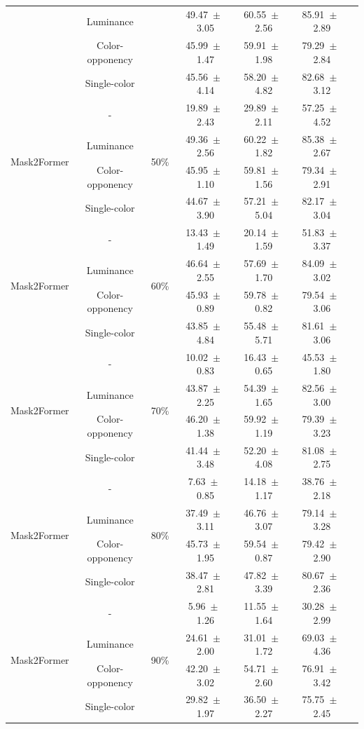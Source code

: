 \begin{table}[h]
\begin{tabular}{@{}lccc ccc@{}}
& Luminance & & 49.47~$\pm$~3.05 & 60.55~$\pm$~2.56 & 85.91~$\pm$~2.89 \\
& Color-opponency & & 45.99~$\pm$~1.47 & 59.91~$\pm$~1.98 & 79.29~$\pm$~2.84 \\
& Single-color & & 45.56~$\pm$~4.14 & 58.20~$\pm$~4.82 & 82.68~$\pm$~3.12 \\
\midrule
\multirow{4}{*}{Mask2Former} & - & \multirow{4}{*}{50\%} & 19.89~$\pm$~2.43 & 29.89~$\pm$~2.11 & 57.25~$\pm$~4.52 \\
& Luminance & & 49.36~$\pm$~2.56 & 60.22~$\pm$~1.82 & 85.38~$\pm$~2.67 \\
& Color-opponency & & 45.95~$\pm$~1.10 & 59.81~$\pm$~1.56 & 79.34~$\pm$~2.91 \\
& Single-color & & 44.67~$\pm$~3.90 & 57.21~$\pm$~5.04 & 82.17~$\pm$~3.04 \\
\midrule
\multirow{4}{*}{Mask2Former} & - & \multirow{4}{*}{60\%} & 13.43~$\pm$~1.49 & 20.14~$\pm$~1.59 & 51.83~$\pm$~3.37 \\
& Luminance & & 46.64~$\pm$~2.55 & 57.69~$\pm$~1.70 & 84.09~$\pm$~3.02 \\
& Color-opponency & & 45.93~$\pm$~0.89 & 59.78~$\pm$~0.82 & 79.54~$\pm$~3.06 \\
& Single-color & & 43.85~$\pm$~4.84 & 55.48~$\pm$~5.71 & 81.61~$\pm$~3.06 \\
\midrule
\multirow{4}{*}{Mask2Former} & - & \multirow{4}{*}{70\%} & 10.02~$\pm$~0.83 & 16.43~$\pm$~0.65 & 45.53~$\pm$~1.80 \\
& Luminance & & 43.87~$\pm$~2.25 & 54.39~$\pm$~1.65 & 82.56~$\pm$~3.00 \\
& Color-opponency & & 46.20~$\pm$~1.38 & 59.92~$\pm$~1.19 & 79.39~$\pm$~3.23 \\
& Single-color & & 41.44~$\pm$~3.48 & 52.20~$\pm$~4.08 & 81.08~$\pm$~2.75 \\
\midrule
\multirow{4}{*}{Mask2Former} & - & \multirow{4}{*}{80\%} & 7.63~$\pm$~0.85 & 14.18~$\pm$~1.17 & 38.76~$\pm$~2.18 \\
& Luminance & & 37.49~$\pm$~3.11 & 46.76~$\pm$~3.07 & 79.14~$\pm$~3.28 \\
& Color-opponency & & 45.73~$\pm$~1.95 & 59.54~$\pm$~0.87 & 79.42~$\pm$~2.90 \\
& Single-color & & 38.47~$\pm$~2.81 & 47.82~$\pm$~3.39 & 80.67~$\pm$~2.36 \\
\midrule
\multirow{4}{*}{Mask2Former} & - & \multirow{4}{*}{90\%} & 5.96~$\pm$~1.26 & 11.55~$\pm$~1.64 & 30.28~$\pm$~2.99 \\
& Luminance & & 24.61~$\pm$~2.00 & 31.01~$\pm$~1.72 & 69.03~$\pm$~4.36 \\
& Color-opponency & & 42.20~$\pm$~3.02 & 54.71~$\pm$~2.60 & 76.91~$\pm$~3.42 \\
& Single-color & & 29.82~$\pm$~1.97 & 36.50~$\pm$~2.27 & 75.75~$\pm$~2.45 \\
\midrule
\bottomrule
\end{tabular}
\label{tab:sparse_results_mask2former_acdc_snow}
\end{table}